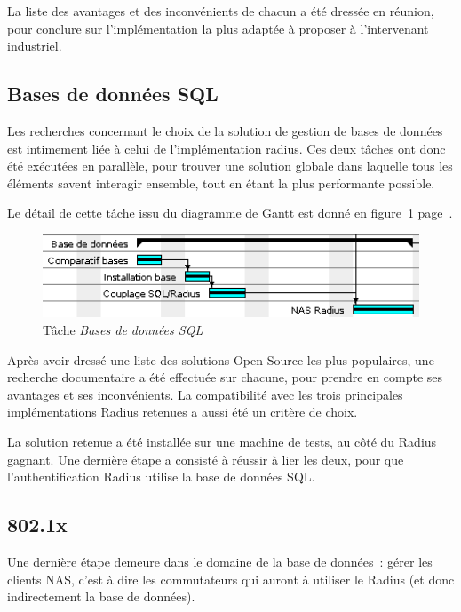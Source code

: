 La liste des avantages et des inconvénients de chacun a été dressée en réunion, pour conclure sur l'implémentation la plus adaptée à proposer à l'intervenant industriel.

\subsection{Bases de données SQL}

Les recherches concernant le choix de la solution de gestion de bases de données est intimement liée à celui de l'implémentation radius. Ces deux tâches ont donc été exécutées en parallèle, pour trouver une solution globale dans laquelle tous les éléments savent interagir ensemble, tout en étant la plus performante possible.

Le détail de cette tâche issu du diagramme de Gantt est donné en figure~\ref{gantt_sql} page~\pageref{gantt_sql}.

\begin{figure}[!h]
	\begin{center}
		\includegraphics[width=350pt]{img/gantt_sql.png}
	\end{center}
	\caption{Tâche \textit{Bases de données SQL}}
	\label{gantt_sql}
\end{figure}

Après avoir dressé une liste des solutions Open Source les plus populaires, une recherche documentaire a été effectuée sur chacune, pour prendre en compte ses avantages et ses inconvénients. La compatibilité avec les trois principales implémentations Radius retenues a aussi été un critère de choix.

La solution retenue a été installée sur une machine de tests, au côté du Radius gagnant. Une dernière étape a consisté à réussir à lier les deux, pour que l'authentification Radius utilise la base de données SQL.

\subsection{802.1x}

Une dernière étape demeure dans le domaine de la base de données~: gérer les clients NAS, c'est à dire les commutateurs qui auront à utiliser le Radius (et donc indirectement la base de données).

